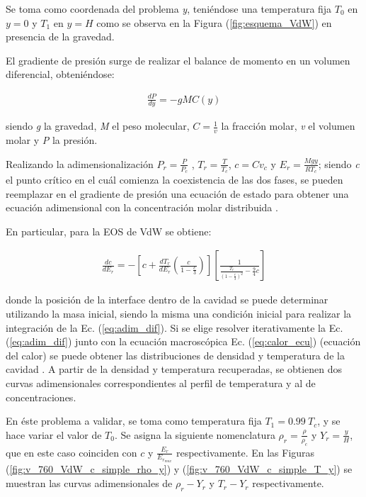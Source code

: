 Se toma como coordenada del problema \textit{y}, teniéndose una temperatura fija $T_{0}$ en $y = 0$ y $T_{1}$ en $y = H$ como se observa en la Figura (\ref{fig:esquema_VdW}) en presencia de la gravedad.

El gradiente de presión surge de realizar el balance de momento en un volumen diferencial, obteniéndose:

\begin{align}
	\frac{d P}{d y} = - g M C(y)
\end{align}

siendo \textit{g} la gravedad, \textit{M} el peso molecular, $C = \frac{1}{v}$ la fracción molar, \textit{v} el volumen molar y \textit{P} la presión.

Realizando la adimensionalización $ P_r = \frac{P}{P_c}$ , $ T_r = \frac{T}{T_c}$, $c = C v_c$ y $E_r = \frac{M g y}{R T_c}$; siendo \textit{c} el punto crítico en el cuál comienza la coexistencia de las dos fases, se pueden reemplazar en el gradiente de presión una ecuación de estado para obtener una ecuación adimensional con la concentración molar distribuida \cite{fogliatto2019simulation}.



En particular, para la EOS de VdW se obtiene:

\begin{align}
	\frac{d c}{d E_r} = - \left[ c + \frac{d T_r}{d E_r} \left( \frac{c}{1 - \frac{c}{3}}\right) \right] \left[	\frac{1}{\frac{T_r}{{\left(1- \frac{c}{3}\right)}^2} - \frac{9}{4} c}  \right] 
	\label{eq:adim_dif}
\end{align} 

donde la posición de la interface dentro de la cavidad se puede determinar utilizando la masa inicial, siendo la misma una condición inicial para realizar la integración de la Ec. (\ref{eq:adim_dif}). Si se elige  resolver iterativamente la Ec. (\ref{eq:adim_dif}) junto con la ecuación macroscópica Ec. (\ref{eq:calor_ecu}) (ecuación del calor) se puede obtener las distribuciones de densidad y temperatura de la cavidad \cite{fogliatto2019simulation}. A partir de la densidad y temperatura recuperadas, se obtienen dos curvas adimensionales correspondientes al perfil de temperatura y al de concentraciones. 

En éste problema a validar, se toma como temperatura fija $T_1 = 0.99 \> T_c$, y se hace variar el valor de  $T_0$. Se asigna la siguiente nomenclatura $\rho_r = \frac{\rho}{\rho_c}$ y  $Y_r = \frac{y}{H}$, que en este caso coinciden con $c$ y $\frac{E_r}{E_{r_{max}}}$ respectivamente. En las Figuras (\ref{fig:v_760_VdW_c_simple_rho_y}) y (\ref{fig:v_760_VdW_c_simple_T_y}) se muestran las curvas adimensionales de $ \rho_r - Y_r $ y $ T_r - Y_r $ respectivamente.
\newline
